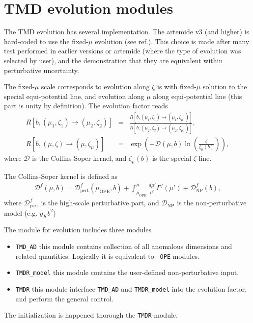\documentclass[prd,nofootinbib,eqsecnum,final]{revtex4}
\renewcommand{\(}{\left(}
\renewcommand{\)}{\right)}
\renewcommand{\[}{\left[}
\renewcommand{\]}{\right]}
\begin{document}
\newpage

\section{TMD evolution modules}

The TMD evolution has several implementation. The artemide v3 (and higher) is hard-coded to use the fixed-$\mu$ evolution (see ref.\cite{Scimemi:2018xaf}). This choice is made after many test performed in earlier versions or artemide (where the type of evolution was selected by user), and the demonstration that they are equivalent within perturbative uncertainty.

The fixed-$\mu$ scale corresponds to evolution along $\zeta$ is with fixed-$\mu$ solution to the special equi-potential line, and evolution along $\mu$ along equi-potential line (this part is unity by definition). The evolution factor reads
\begin{eqnarray}
R[b,(\mu_1,\zeta_1)\to(\mu_2,\zeta_2)]&=&\frac{R[b,(\mu_1,\zeta_1)\to(\mu_1,\zeta_{\mu_1})]}{R[b,(\mu_2,\zeta_2)\to(\mu_2,\zeta_{\mu_2})]},
\\
R[b,(\mu,\zeta)\to(\mu,\zeta_{\mu})]&=&\exp\(-\mathcal{D}(\mu,b)\ln\(\frac{\zeta}{\zeta_\mu(b)}\)\),
\end{eqnarray}
where $\mathcal{D}$ is the Collins-Soper kernel, and $\zeta_\mu(b)$ is the special $\zeta$-line.

The Collins-Soper kernel is defined as
\begin{eqnarray}
\mathcal{D}^f(\mu,b)=\mathcal{D}^f_{\text{pert}}(\mu_{\text{OPE}},b)+\int_{\mu_{\text{OPE}}}^{\mu} \frac{d\mu'}{\mu'}\Gamma^f(\mu')+\mathcal{D}^f_{\text{NP}}(b),
\end{eqnarray}
where $\mathcal{D}^f_{\text{pert}}$ is the high-scale perturbative part, and $\mathcal{D}_{\text{NP}}$ is the non-perturbative model (e.g. $g_Kb^2$)

The module for evolution includes three modules
\begin{itemize}
\item \texttt{TMD\_AD} this module contains collection of all anomalous dimensions and related quantities. Logically it is equivalent to \texttt{\_OPE} modules.
\item \texttt{TMDR\_model} this module contains the user-defined non-perturbative input.
\item \texttt{TMDR} this module interface \texttt{TMD\_AD} and \texttt{TMDR\_model} into the evolution factor, and perform the general control.
\end{itemize}
The initialization is happened thorough the \texttt{TMDR}-module.
\end{document}

